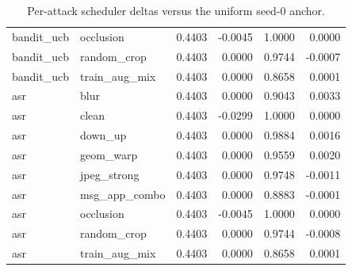 \begin{table}[t]
\begin{tabular}{llrrrr}
bandit\_ucb & occlusion & 0.4403 & -0.0045 & 1.0000 & 0.0000 \\
bandit\_ucb & random\_crop & 0.4403 & 0.0000 & 0.9744 & -0.0007 \\
bandit\_ucb & train\_aug\_mix & 0.4403 & 0.0000 & 0.8658 & 0.0001 \\
asr & blur & 0.4403 & 0.0000 & 0.9043 & 0.0033 \\
asr & clean & 0.4403 & -0.0299 & 1.0000 & 0.0000 \\
asr & down\_up & 0.4403 & 0.0000 & 0.9884 & 0.0016 \\
asr & geom\_warp & 0.4403 & 0.0000 & 0.9559 & 0.0020 \\
asr & jpeg\_strong & 0.4403 & 0.0000 & 0.9748 & -0.0011 \\
asr & msg\_app\_combo & 0.4403 & 0.0000 & 0.8883 & -0.0001 \\
asr & occlusion & 0.4403 & -0.0045 & 1.0000 & 0.0000 \\
asr & random\_crop & 0.4403 & 0.0000 & 0.9744 & -0.0008 \\
asr & train\_aug\_mix & 0.4403 & 0.0000 & 0.8658 & 0.0001 \\
\bottomrule
\end{tabular}
\caption{Per-attack scheduler deltas versus the uniform seed-0 anchor.}
\label{tab:stage2_scheduler_delta}
\end{table}
